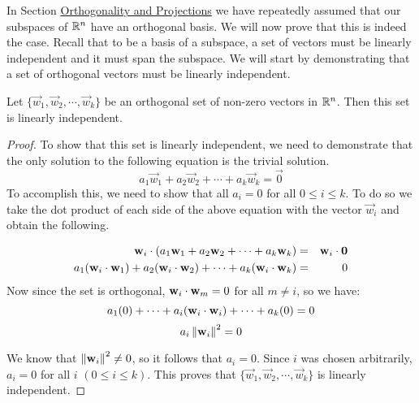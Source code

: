\documentclass{ximera}
\begin{document}
In Section \href{https://ximera.osu.edu/oerlinalg/LinearAlgebra/RTH-0010/main}{Orthogonality and Projections} we have repeatedly assumed that our subspaces of $\mathbb{R}^n$ have an orthogonal basis.  We will now prove that this is indeed the case.  Recall that to be a basis of a subspace, a set of vectors must be linearly independent and it must span the subspace.  We will start by demonstrating that a set of orthogonal vectors must be linearly independent.

\begin{theorem}\label{orthbasis}
Let $ \{ \vec{w}_1, \vec{w}_2, \cdots, \vec{w}_k \}$ be an
orthogonal set of non-zero vectors in $\mathbb{R}^n$. Then this set is
linearly independent.%
\end{theorem}

\begin{proof}
To show that this set is linearly independent, we need to demonstrate that the only solution to the following equation is the trivial solution.
\[
a_1 \vec{w}_1 + a_2 \vec{w}_2 + \cdots + a_k \vec{w}_k = \vec{0}
\]
To accomplish this, we need to show that all $a_i = 0$ for all $0\leq i\leq k$.  To do so we take the dot product of
each side of the above equation with the vector $\vec{w}_i$ and obtain the following.

\begin{eqnarray*}
\mathbf{w}_i \cdot (a_1 \mathbf{w}_1 + a_2 \mathbf{w}_2 + \cdots + a_k \mathbf{w}_k ) &=& \mathbf{w}_i \cdot \mathbf{0}\\
a_1 (\mathbf{w}_i \cdot \mathbf{w}_1) + a_2 (\mathbf{w}_i \cdot \mathbf{w}_2) + \cdots + a_k (\mathbf{w}_i \cdot \mathbf{w}_k)  &=& 0
\end{eqnarray*}
Now since the set is orthogonal, $\mathbf{w}_i \cdot \mathbf{w}_m = 0$ for all $m \neq i$, so we have:
\[
a_1 (0) + \cdots + a_i(\mathbf{w}_i \cdot \mathbf{w}_i) + \cdots + a_k (0) = 0
\]
\[
a_i \left\lVert\mathbf{w}_i\right\rVert^2 = 0
\]

We know that $\left\lVert\mathbf{w}_i\right\rVert^2  \neq 0$, so it follows that $a_i =0$. Since $i$ was chosen arbitrarily, $a_i =0$ for all $i$ $(0\leq i\leq k)$. This proves that $\{ \vec{w}_1, \vec{w}_2, \cdots, \vec{w}_k \}$ is linearly independent.


\end{proof}
\end{document}
